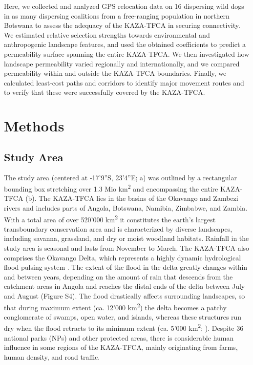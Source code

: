 \documentclass[abstract=on,10pt,a4paper,bibliography=totocnumbered]{article}
\begin{document}
Here, we collected and analyzed GPS relocation data on 16 dispersing wild dogs
in as many dispersing coalitions from a free-ranging population in northern
Botswana to assess the adequacy of the KAZA-TFCA in securing connectivity. We
estimated relative selection strengths towards environmental
and anthropogenic landscape features, and used the obtained coefficients to
predict a permeability surface spanning the entire KAZA-TFCA. We then
investigated how landscape permeability varied regionally and internationally,
and we compared permeability within and outside the KAZA-TFCA boundaries.
Finally, we calculated least-cost paths and corridors to identify major movement
routes and to verify that these were successfully covered by the KAZA-TFCA.

\section{Methods}
\subsection{Study Area}
The study area (centered at -17'9''S, 23'4''E;
a) was outlined by a rectangular bounding box stretching over
1.3 Mio km\textsuperscript{2} and encompassing the entire KAZA-TFCA
(b). The KAZA-TFCA lies in the basins of the Okavango and
Zambezi rivers and includes parts of Angola, Botswana, Namibia, Zimbabwe, and
Zambia. With a total area of over 520'000 km\textsuperscript{2} it constitutes
the earth's largest transboundary conservation area and is characterized by
diverse landscapes, including savanna, grassland, and dry or moist woodland
habitats. Rainfall in the study area is seasonal and lasts from November to
March. The KAZA-TFCA also comprises the Okavango Delta, which represents a
highly dynamic hydrological flood-pulsing system \citep{McNutt.1996,
Wolski.2017}. The extent of the flood in the delta greatly changes within and
between years, depending on the amount of rain that descends from the catchment
areas in Angola and reaches the distal ends of the delta between July and August
(Figure S4). The flood drastically affects surrounding landscapes, so that
during maximum extent (ca. 12'000 km\textsuperscript{2}) the delta becomes a
patchy conglomerate of swamps, open water, and islands, whereas these structures
run dry when the flood retracts to its minimum extent (ca. 5'000
km\textsuperscript{2}; \citealp{Wolski.2017}). Despite 36 national parks (NPs)
and other protected areas, there is considerable human influence in some regions
of the KAZA-TFCA, mainly originating from farms, human density, and road
traffic.
\end{document}
